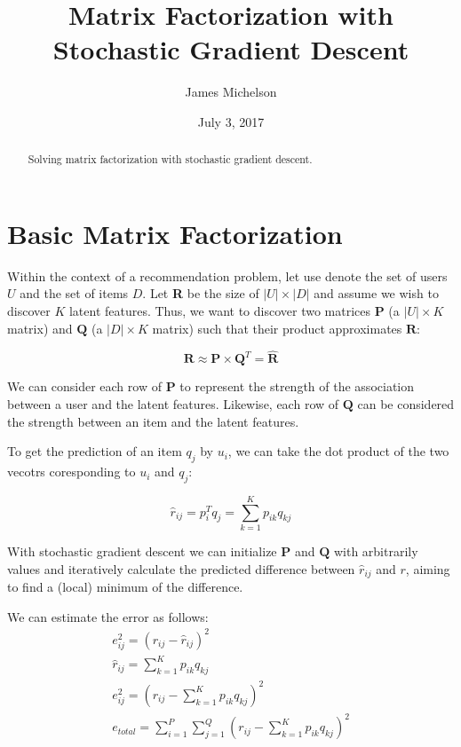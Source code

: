 \documentclass[12pt,reqno]{article}
\title{Matrix Factorization with Stochastic Gradient Descent}
\date{July 3, 2017}
\author{James Michelson}
\begin{document}
\maketitle

\begin{abstract}
Solving matrix factorization with stochastic gradient descent.
\end{abstract}

\section{Basic Matrix Factorization}

Within the context of a recommendation problem, let use denote the set of users
$U$ and the set of items $D$. Let \textbf{R} be the size of
$|\textit{U}|\times|\textit{D}|$ and assume we wish to discover $K$ latent
features. Thus, we want to discover two matrices $\mathbf{P}$ (a $|\textit{U}|\times K$ matrix)
and $\mathbf{Q}$ (a $|\textit{D}|\times K$ matrix) such that their
product approximates $\textbf{R}$:

\begin{equation}
\textbf{R} \approx \textbf{P}\times\textbf{Q}^T = \hat{\textbf{R}}
\end{equation}

We can consider each row of $\textbf{P}$ to represent the strength of the
association between a user and the latent features. Likewise, each row of
$\textbf{Q}$ can be considered the strength between an item and the latent
features.

To get the prediction of an item $q_j$ by $u_i$, we can take the dot product of
the two vecotrs coresponding to $u_i$ and $q_j$:

\begin{equation}
\hat{r}_{ij} = p_i^Tq_j = \sum_{k=1}^{K}p_{ik} q_{kj}
\end{equation}

With stochastic gradient descent we can initialize $\textbf{P}$ and $\textbf{Q}$
with arbitrarily values and iteratively calculate the predicted difference
between $\hat{r}_{ij}$ and $r$, aiming to find a (local) minimum of the
difference.

We can estimate the error as follows:
\begin{align}
e_{ij}^2 = (r_{ij} - \hat{r}_{ij})^2 \\
\hat{r}_{ij} = \sum_{k=1}^{K}p_{ik} q_{kj} \\
e_{ij}^2 = (r_{ij} - \sum_{k=1}^{K}p_{ik} q_{kj})^2 \\
e_{total} = \sum_{i=1}^{P} \sum_{j=1}^{Q} (r_{ij} - \sum_{k=1}^{K}p_{ik} q_{kj})^2
\end{align}
\end{document}
